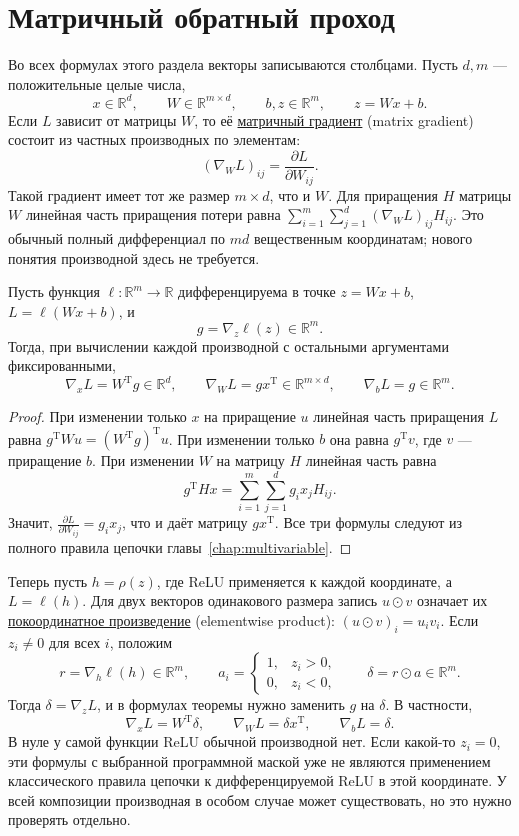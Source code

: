 \section{Матричный обратный проход}
Во всех формулах этого раздела векторы записываются столбцами. Пусть \(d,m\) --- положительные целые числа,
\[
 x\in\mathbb R^d,\qquad W\in\mathbb R^{m\times d},\qquad
 b,z\in\mathbb R^m,\qquad z=Wx+b.
\]
Если \(L\) зависит от матрицы \(W\), то её \underline{матричный градиент} (matrix gradient) состоит из частных производных по элементам:
\[
 (\nabla_W L)_{ij}=\frac{\partial L}{\partial W_{ij}}.
\]
Такой градиент имеет тот же размер \(m\times d\), что и \(W\).
Для приращения \(H\) матрицы \(W\) линейная часть приращения потери равна
\(\sum_{i=1}^m\sum_{j=1}^d(\nabla_WL)_{ij}H_{ij}\).
Это обычный полный дифференциал по \(md\) вещественным координатам; нового понятия производной здесь не требуется.

\begin{theorem}
Пусть функция \(\ell:\mathbb R^m\to\mathbb R\) дифференцируема в точке \(z=Wx+b\),
\(L=\ell(Wx+b)\), и
\[
 g=\nabla_z\ell(z)\in\mathbb R^m.
\]
Тогда, при вычислении каждой производной с остальными аргументами фиксированными,
\[
 \nabla_x L=W^{\mathrm T}g\in\mathbb R^d,\qquad
 \nabla_W L=gx^{\mathrm T}\in\mathbb R^{m\times d},\qquad
 \nabla_b L=g\in\mathbb R^m.
\]
\end{theorem}
\begin{proof}
При изменении только \(x\) на приращение \(u\) линейная часть приращения \(L\)
равна \(g^{\mathrm T}Wu=(W^{\mathrm T}g)^{\mathrm T}u\).
При изменении только \(b\) она равна \(g^{\mathrm T}v\), где \(v\) --- приращение \(b\).
При изменении \(W\) на матрицу \(H\) линейная часть равна
\[
 g^{\mathrm T}Hx
 =\sum_{i=1}^m\sum_{j=1}^d g_i x_j H_{ij}.
\]
Значит, \(\frac{\partial L}{\partial W_{ij}}=g_i x_j\), что и даёт матрицу
\(gx^{\mathrm T}\). Все три формулы следуют из полного правила цепочки
главы~\ref{chap:multivariable}.
\end{proof}

Теперь пусть \(h=\rho(z)\), где ReLU применяется к каждой координате,
а \(L=\ell(h)\). Для двух векторов одинакового размера запись
\(u\odot v\) означает их \underline{покоординатное произведение} (elementwise product):
\((u\odot v)_i=u_iv_i\). Если \(z_i\ne0\) для всех \(i\), положим
\[
 r=\nabla_h\ell(h)\in\mathbb R^m,\qquad
 a_i=\begin{cases}1,&z_i>0,\\0,&z_i<0,\end{cases}\qquad
 \delta=r\odot a\in\mathbb R^m.
\]
Тогда \(\delta=\nabla_z L\), и в формулах теоремы нужно заменить \(g\) на \(\delta\).
В частности,
\[
 \nabla_x L=W^{\mathrm T}\delta,\qquad
 \nabla_W L=\delta x^{\mathrm T},\qquad
 \nabla_b L=\delta.
\]
В нуле у самой функции ReLU обычной производной нет. Если какой-то \(z_i=0\),
эти формулы с выбранной программной маской уже не являются применением
классического правила цепочки к дифференцируемой ReLU в этой координате.
У всей композиции производная в особом случае может существовать, но это
нужно проверять отдельно.

